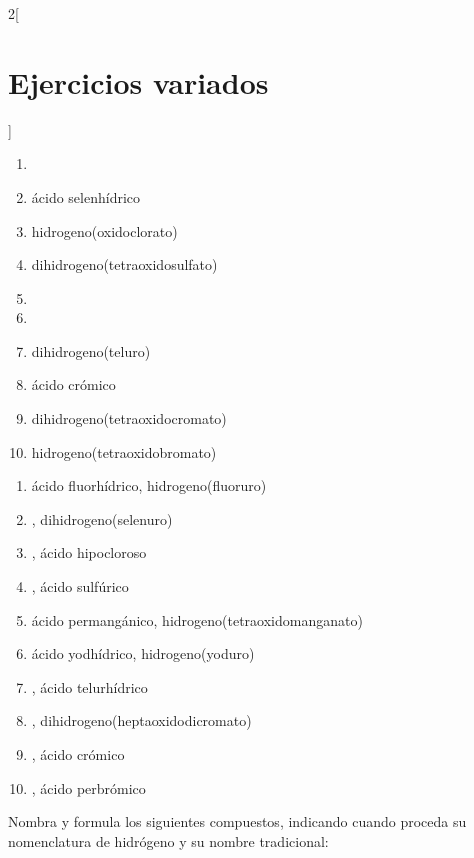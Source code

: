 \documentclass[10pt]{article}
\begin{document}
\begin{multicols*}{2}[
  \section{Ejercicios variados}
  ]
\begin{exercise}[
    tags    = {inorgánica,ácidos,ácidos binarios,ácidos ternarios,oxoácidos},
    topics  = {química inorgánica,formulación,nomenclatura},
    source  = {SAN Formulación, p28, e34},
  ]
  \begin{enumerate}
    \item {}
    \item ácido selenhídrico
    \item hidrogeno(oxidoclorato)
    \item dihidrogeno(tetraoxidosulfato)
    \item {}
    \item {}
    \item dihidrogeno(teluro)
    \item ácido crómico
    \item dihidrogeno(tetraoxidocromato)
    \item hidrogeno(tetraoxidobromato)
  \end{enumerate}
\end{exercise}

\begin{solution}
  \begin{enumerate}
    \item ácido fluorhídrico, hidrogeno(fluoruro)
    \item {}, dihidrogeno(selenuro)
    \item {}, ácido hipocloroso
    \item {}, ácido sulfúrico
    \item ácido permangánico,  hidrogeno(tetraoxidomanganato)
    \item ácido yodhídrico, hidrogeno(yoduro)
    \item {}, ácido telurhídrico
    \item {}, dihidrogeno(heptaoxidodicromato)
    \item {}, ácido crómico
    \item {}, ácido perbrómico
  \end{enumerate}
\end{solution}




\begin{exercise}[
  tags    = {inorgánica,ácidos,ácidos binarios,ácidos ternarios,oxoácidos},
  topics  = {química inorgánica,formulación,nomenclatura},
  source  = {SAN Formulación, p28, e35},
  ]
  Nombra y formula los siguientes compuestos, indicando cuando proceda su nomenclatura de hidrógeno y su nombre tradicional:


\end{exercise}
\end{multicols*}
\end{document}
